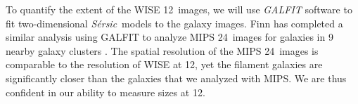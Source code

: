 \documentclass[11pt, preprint]{aastex}
\newcommand{\sers}{{\it S\'{e}rsic}}
\begin{document}
{%



To quantify the extent of the WISE 12\micron \ images, 
we will use  {\it GALFIT} software \citep{peng02}
to fit two-dimensional \sers \ models to the galaxy images.  
Finn has completed a similar analysis using GALFIT to analyze MIPS
24\micron \ images for galaxies in 9 nearby galaxy clusters \citep{finn16}.  The
spatial resolution of the MIPS 24\micron \ images is comparable to the
resolution of WISE at 12\micron, yet the filament galaxies are
significantly closer than the galaxies that we analyzed with MIPS.
We are thus confident in our ability to measure sizes at 12\micron.  





}
\end{document}
